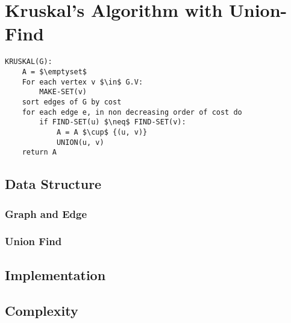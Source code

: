 \section{Kruskal's Algorithm with Union-Find}\label{kruskal_uf}

\begin{lstlisting}[mathescape=true]
KRUSKAL(G):
	A = $\emptyset$
	For each vertex v $\in$ G.V:
		MAKE-SET(v)
	sort edges of G by cost
	for each edge e, in non decreasing order of cost do	
		if FIND-SET(u) $\neq$ FIND-SET(v):       
			A = A $\cup$ {(u, v)}
			UNION(u, v)
	return A
\end{lstlisting}


\subsection{Data Structure}

	\subsubsection{Graph and Edge}
	
	
	\subsubsection{Union Find}
		

	\subsection{Implementation}
		
	
	\subsection{Complexity}
	

\pagebreak